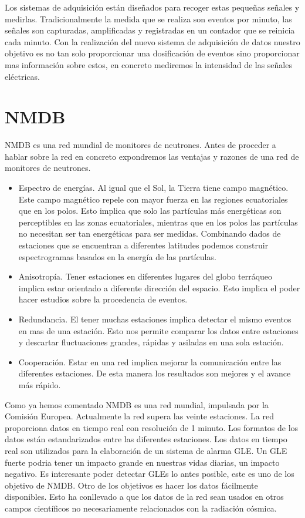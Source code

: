 	Los sistemas de adquisición están diseñados para recoger estas pequeñas señales y medirlas. Tradicionalmente la medida que se realiza son 
	eventos por minuto, las señales son capturadas, amplificadas y registradas en un contador que se reinicia cada minuto. Con la realización
	del nuevo sistema de adquisición de datos nuestro objetivo es no tan solo proporcionar una dosificación de eventos sino proporcionar mas 
	información sobre estos, en concreto mediremos la intensidad de las señales eléctricas. 


\section{NMDB}
	NMDB es una red mundial de monitores de neutrones. Antes de proceder a hablar sobre la red en concreto expondremos las ventajas y razones de
	una red de monitores de neutrones.
	\begin{itemize}
		\item 	Espectro de energías. Al igual que el Sol, la Tierra tiene campo magnético. Este campo magnético repele con mayor fuerza en
		  	las regiones ecuatoriales que en los polos. Esto implica que solo las partículas más energéticas son perceptibles en las
			zonas ecuatoriales, mientras que en los polos las partículas no necesitan ser tan energéticas para ser medidas. Combinando
			dados de estaciones que se encuentran a diferentes latitudes podemos construir espectrogramas basados en la energía de las
			partículas.
		\item 	Anisotropía. Tener estaciones en diferentes lugares del globo terráqueo implica estar orientado a diferente dirección del
		  	espacio. Esto implica el poder hacer estudios sobre la procedencia de eventos.
		\item 	Redundancia. El tener muchas estaciones implica detectar el mismo eventos en mas de una estación. Esto nos permite comparar
		  	los datos entre estaciones y descartar fluctuaciones grandes, rápidas y asiladas en una sola estación.
		\item 	Cooperación. Estar en una red implica mejorar la comunicación entre las diferentes estaciones. De esta manera los resultados
		  	son mejores y el avance más rápido. 
	\end{itemize}
	Como ya hemos comentado NMDB es una red mundial, impulsada por la Comisión Europea. Actualmente la red supera las veinte estaciones. La red 
	proporciona datos en tiempo real con resolución de 1 minuto. Los formatos de los datos están estandarizados entre las diferentes estaciones.
	Los datos en tiempo real son utilizados para la elaboración de un sistema de alarma GLE. Un GLE fuerte podria tener un impacto grande en
	nuestras vidas diarias, un impacto negativo. Es interesante poder detectar GLEs lo antes posible, este es uno de los objetivo de NMDB.
	Otro de los objetivos es hacer los datos fácilmente disponibles. Esto ha conllevado a que los datos de la red sean usados en otros campos 
	científicos no necesariamente relacionados con la radiación cósmica. 



